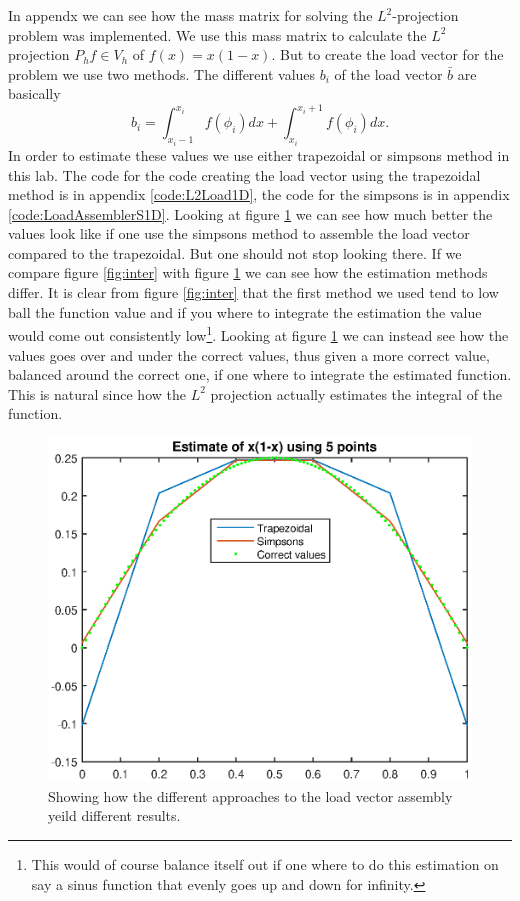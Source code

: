 \documentclass[11pt]{article}
\begin{document}
In appendx \label{code:L2mass1D} we can see how the mass matrix for solving the $L^2$-projection problem was implemented. We use this mass matrix to calculate the $L^2$ projection $P_h f \in V_h$ of $f(x) = x(1-x)$. But to create the load vector for the problem we use two methods. The different values $b_i$ of the load vector $\bar{b}$ are basically 
\begin{equation}
	b_i = \int_{x_i - 1}^{x_i} f(\phi_i) dx + \int_{x_i}^{x_i+1} f(\phi_i) dx.
\end{equation}
In order to estimate these values we use either trapezoidal or simpsons method in this lab. The code for the code creating the load vector using the trapezoidal method is in appendix \ref{code:L2Load1D}, the code for the simpsons is in appendix \ref{code:LoadAssemblerS1D}. Looking at figure \ref{fig:l2proj} we can see how much better the values look like if one use the simpsons method to assemble the load vector compared to the trapezoidal. But one should not stop looking there. If we compare figure \ref{fig:inter} with figure \ref{fig:l2proj} we can see how the estimation methods differ. It is clear from figure \ref{fig:inter} that the first method we used tend to low ball the function value and if you where to integrate the estimation the value would come out consistently low\footnote{This would of course balance itself out if one where to do this estimation on say a sinus function that evenly goes up and down for infinity.}. Looking at figure \ref{fig:l2proj} we can instead see how the values goes over and under the correct values, thus given a more correct value, balanced around the correct one,  if one where to integrate the estimated function. This is natural since how the $L^2$ projection actually estimates the integral of the function. 
\begin{figure}[H]
	\centering
	\includegraphics[width=1\textwidth]{../ex1/l2proj}
	\caption{Showing how the different approaches to the load vector assembly yeild different results.}
	\label{fig:l2proj}
\end{figure}
\end{document}
